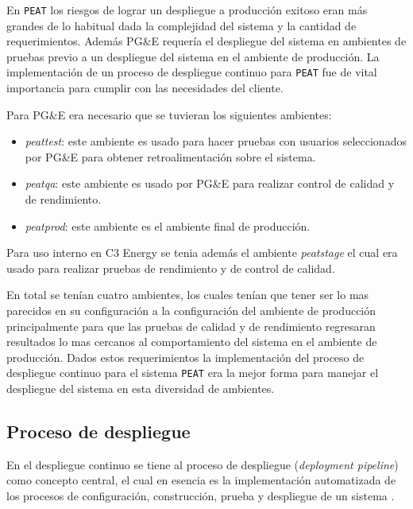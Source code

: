 En \texttt{PEAT} los riesgos de lograr un despliegue a producción exitoso
eran más grandes de lo habitual dada la complejidad del sistema y la cantidad
de requerimientos. Además PG\&E requería el despliegue del sistema en ambientes
de pruebas previo a un despliegue del sistema en el ambiente de producción.
La implementación de un proceso de despliegue continuo para \texttt{PEAT} fue de
vital importancia para cumplir con las necesidades del cliente.

\vspace{2.5mm}

Para PG\&E era necesario que se tuvieran los siguientes ambientes:
\begin{itemize}
\item \textit{peattest}: este ambiente es usado para hacer pruebas con usuarios
  seleccionados por PG\&E para obtener retroalimentación sobre el sistema.
\item \textit{peatqa}: este ambiente es usado por PG\&E para realizar control de
  calidad y de rendimiento.
\item \textit{peatprod}: este ambiente es el ambiente final de producción.
\end{itemize}

Para uso interno en C3 Energy se tenia además el ambiente \textit{peatstage}
el cual era usado para realizar pruebas de rendimiento y de control de calidad.

En total se tenían cuatro ambientes, los cuales tenían que tener ser lo mas
parecidos en su configuración a la configuración del ambiente de producción
principalmente para que las pruebas de calidad y de rendimiento regresaran resultados
lo mas cercanos al comportamiento del sistema en el ambiente de producción.
Dados estos requerimientos la implementación del proceso de despliegue continuo para
el sistema \texttt{PEAT} era la mejor forma para manejar el despliegue del sistema
en esta diversidad de ambientes.

\subsection{Proceso de despliegue}

En el despliegue continuo se tiene al proceso de despliegue (\textit{deployment
  pipeline}) como concepto central, el cual en esencia es la implementación
automatizada de los procesos de configuración, construcción, prueba y despliegue de
un sistema \cite{28_humble_farley_2011}.

\vspace{2.5mm}

